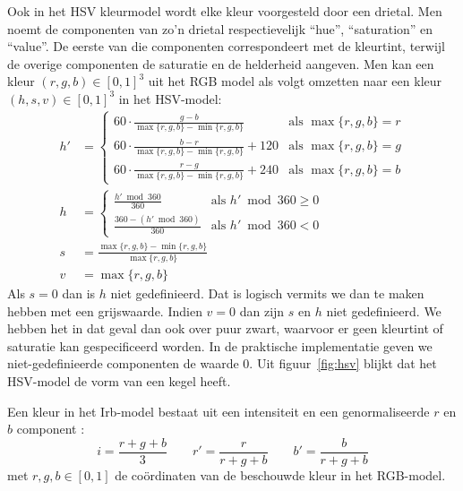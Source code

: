 Ook in het HSV kleurmodel \cite{tkalcic:colour_spaces} wordt elke kleur voorgesteld 
door een drietal. Men noemt de componenten van zo'n drietal respectievelijk 
``hue'', ``saturation'' en ``value''. De eerste van die componenten 
correspondeert met de kleurtint, terwijl de overige componenten de saturatie
en de helderheid aangeven. Men kan een kleur $(r,g,b) \in [0,1]^3$ uit het RGB 
model als volgt omzetten naar een kleur $(h,s,v) \in [0,1]^3$ in het HSV-model: 
\begin{align*}
h' & = \begin{cases}
60 \cdot \frac{g - b}{\max \{r,g,b\} - \min \{r,g,b\}} & \textrm{als } \max \{r,g,b\} = r \\[2pt]
60 \cdot \frac{b - r}{\max \{r,g,b\} - \min \{r,g,b\}} + 120 & \textrm{als } \max \{r,g,b\} = g \\[2pt]
60 \cdot \frac{r - g}{\max \{r,g,b\} - \min \{r,g,b\}} + 240 & \textrm{als } \max \{r,g,b\} = b
\end{cases} \\[2pt]
h & = \begin{cases}
\frac{h' \bmod 360}{360} & \textrm{als } h' \bmod 360 \geq 0 \\[2pt] 
\frac{360 - (h' \bmod 360)}{360} & \textrm{als } h' \bmod 360 < 0 
\end{cases} \\[2pt]
s & = \frac{\max \{r,g,b\} - \min \{r,g,b\}}{\max \{r,g,b\}} \\ %
v & = \max \{r,g,b\}
\end{align*}
Als $s=0$ dan is $h$ niet gedefinieerd. Dat is logisch vermits we dan te 
maken hebben met een grijswaarde. Indien $v=0$ dan zijn $s$ en $h$ niet gedefinieerd. We 
hebben het in dat geval dan ook over puur zwart, waarvoor er geen kleurtint of 
saturatie kan gespecificeerd worden. In de praktische implementatie geven we 
niet-gedefinieerde componenten de waarde $0$. Uit figuur~\ref{fig:hsv} blijkt dat
het HSV-model de vorm van een kegel heeft.

Een kleur in het Irb-model bestaat uit een intensiteit en een genormaliseerde $r$ en $b$ 
component \cite{ohta:color_info_for_region_segm}:
\begin{displaymath}
 i = \frac{r+g+b}{3} \qquad r' = 
\frac{r}{r+g+b} \qquad b' = \frac{b}{r+g+b}
\end{displaymath}
met $r,g,b \in [0,1]$ de co\"ordinaten van de beschouwde kleur in het RGB-model. 

